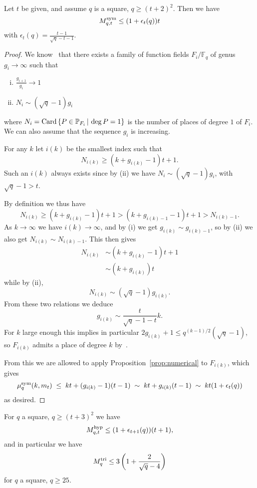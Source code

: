 \documentclass[11pt]{article}
\begin{document}
\begin{prop}
\label{prop:asymptsquare}
Let $t$ be given, and assume $q$ is a square, $q\geq(t+2)^2$.
Then we have
\[
M^{\textrm{sym}}_{q,t}\leq(1+\epsilon_t(q))t
\]
with $\epsilon_t(q)=\frac{t-1}{\sqrt{q}-t-1}$.
\end{prop}
\begin{proof}
We know~\cite{STV92} that there exists a family of function fields
$F_i/\mathbb{F}_q$ of genus $g_i\to\infty$ such that
\begin{enumerate}[(i)]
  \item $\frac{g_{i+1}}{g_i}\to1$
  \item $N_i\sim (\sqrt q - 1)g_i$
\end{enumerate}
where $N_i = \operatorname{Card}\left\{ P\in\mathbb{P}_{F_i}\,|\,\deg P = 1 \right\}$
is the number of places of degree $1$ of $F_i$. We can also assume that the sequence
$g_i$ is increasing. 

For any $k$ let $i(k)$ be the smallest index such that
\[ N_{i(k)} \geq (k + g_{i(k)}-1)t +1. \]
Such an $i(k)$ always exists since by (ii) we have $N_i\sim (\sqrt q - 1)g_i$,
with $\sqrt q - 1>t$.

By definition we thus have
\[ N_{i(k)} \geq (k + g_{i(k)}-1)t +1 > (k + g_{i(k)-1}-1)t +1 > N_{i(k)-1}. \]
As $k\to\infty$ we have $i(k)\to\infty$, and by (i) we get $g_{i(k)}\sim g_{i(k)-1}$,
so by (ii) we also get $N_{i(k)}\sim N_{i(k)-1}$. This then gives
\[ \begin{split} N_{i(k)} &\sim (k + g_{i(k)}-1)t +1\\ &\sim (k + g_{i(k)})t \end{split} \]
while by (ii),
\[ N_{i(k)} \sim (\sqrt q - 1)g_{i(k)}. \]
From these two relations we deduce
\[ g_{i(k)} \sim \frac{t}{\sqrt{q}-1-t}k. \]
For $k$ large enough this implies in particular $2g_{i(k)} +1 \leq q^{(k-1)/2}(\sqrt q-1)$,
so $F_{i(k)}$ admits a place of degree $k$ by~\cite[Cor.~5.2.10]{Stichtenoth09}.

From this we are allowed to apply Proposition~\ref{prop:numerical} to $F_{i(k)}$, which gives
\[ \mu^{\textrm{sym}}_q(k,m_t)\;\leq\; kt+(g_{i(k)}-1)(t-1)\;\sim\; kt+g_{i(k)}(t-1)\;\sim\; kt(1+\epsilon_t(q)) \]
as desired.
\end{proof}

\begin{cor}
\label{cor:asymptsquare}
For $q$ a square, $q\geq(t+3)^2$ we have
\[
M^{\textrm{hyp}}_{q,t}\leq(1+\epsilon_{t+1}(q))(t+1),
\]
and in particular we have
\[ M^{\textrm{tri}}_q\leq 3\left(1+\frac{2}{\sqrt{q}-4}\right) \]
for $q$ a square, $q\geq 25$.
\end{cor}
\end{document}
